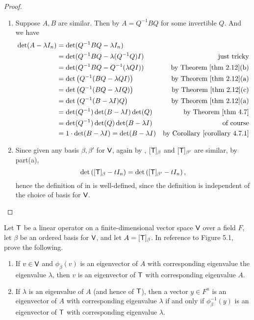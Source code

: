 \begin{proof} \ 

\begin{enumerate}
\item
Suppose \(A, B\) are similar.
Then by  \(A = Q^{-1} B Q\) for some invertible \(Q\).
And we have
\begin{align*}
    \det(A - \lambda I_n) & = \det(Q^{-1} B Q - \lambda I_n) \\
        & = \det(Q^{-1} B Q - \lambda (Q^{-1} Q) I) & \text{just tricky} \\
        & = \det(Q^{-1} B Q - Q^{-1} (\lambda Q I)) & \text{by \THM{2.12}(b)} \\
        & = \det \left( Q^{-1} (BQ - \lambda Q I) \right) & \text{by \THM{2.12}(a)} \\
        & = \det \left( Q^{-1} (BQ - \lambda I Q ) \right) & \text{by \THM{2.12}(c)} \\
        & = \det \left( Q^{-1} (B - \lambda I ) Q \right) & \text{by \THM{2.12}(a)} \\
        & = \det ( Q^{-1} ) \det (B - \lambda I ) \det (Q) & \text{by \THM{4.7}} \\
        & = \det ( Q^{-1} ) \det (Q) \det (B - \lambda I) & \text{of course} \\
        & = 1 \cdot \det(B - \lambda I) = \det(B - \lambda I) & \text{by \CORO{4.7.1}}
\end{align*}

\item
Since given any basis \(\beta, \beta'\) for \(\textsf{V}\), again by , \([\textsf{T}]_{\beta}\) and \([\textsf{T}]_{\beta'}\) are similar, by part(a),
\[
    \det \left( [\textsf{T}]_{\beta} - t I_n \right) = \det \left( [\textsf{T}]_{\beta'} - t I_n \right),
\]
hence the definition of \CPOLY{} in  is well-defined, since the definition is independent of the choice of basis for \(\textsf{V}\).
\end{enumerate}
\end{proof}

\begin{exercise} \label{exercise 5.1.14}
Let \(\textsf{T}\) be a linear operator on a finite-dimensional vector space \(\textsf{V}\) over a field \(F\), let \(\beta\) be an ordered basis for \(\textsf{V}\), and let \(A = [\textsf{T}]_{\beta}\).
In reference to Figure 5.1, prove the following.
\begin{enumerate}
\item If \(v \in \textsf{V}\) and \(\phi_{\beta}(v)\) is an eigenvector of \(A\) with corresponding eigenvalue the eigenvalue \(\lambda\), then \(v\) is an eigenvector of \(\textsf{T}\) with corresponding eigenvalue \(A\).
\item If \(\lambda\) is an eigenvalue of \(A\) (and hence of \(\textsf{T}\)), then a vector \(y \in F^n\) is an eigenvector of \(A\) with corresponding eigenvalue \(\lambda\) if and only if \(\phi_{\beta}^{-1}(y)\) is an eigenvector of \(\textsf{T}\) with corresponding eigenvalue \(\lambda\).
\end{enumerate}
\end{exercise}

